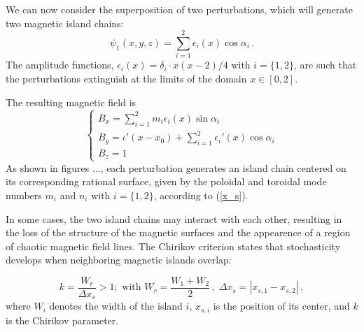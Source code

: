 We can now consider the superposition of two perturbations, which will generate two magnetic island chains:
\begin{equation}
	\psi_1(x,y,z)=\sum_{i=1}^2\epsilon_i(x)\cos\alpha_i\,.
\end{equation}
The amplitude functions, $\epsilon_i(x)=\delta_i\cdot x(x-2)/4$ with $i=\lbrace1,2\rbrace$, are such that the perturbations extinguish at the limits of the domain $x\in[0,2]$.

The resulting magnetic field is
\begin{equation}\label{B_two_pert}
\begin{cases}
	B_x = \sum_{i=1}^2m_i\epsilon_i(x)\sin\alpha_i \\
	B_y = \iota'(x-x_0) + \sum_{i=1}^2\epsilon_i'(x)\cos\alpha_i\\
	B_z = 1
\end{cases} 
\end{equation}
As shown in figures ..., each perturbation generates an island chain centered on its corresponding rational surface, given by the poloidal and toroidal mode numbers $m_i$ and $n_i$ with $i=\lbrace1,2\rbrace$, according to (\ref{x_s}).

In some cases, the two island chains may interact with each other, resulting in the loss of the structure of the magnetic surfaces and the appearence of a region of chaotic magnetic field lines. The Chirikov criterion \cite{} states that stochasticity develops when neighboring magnetic islands overlap:

\begin{equation}\label{Chirikov_crit}
k=\frac{W_r}{\Delta x_s}>1;\text{ with }W_r=\frac{W_1+W_2}{2}\,,\;\Delta x_s=|x_{s,1}-x_{s,2}|\,,
\end{equation}
where $W_i$ denotes the width of the island $i$, $x_{s,i}$ is the position of its center, and $k$ is the Chirikov parameter.

